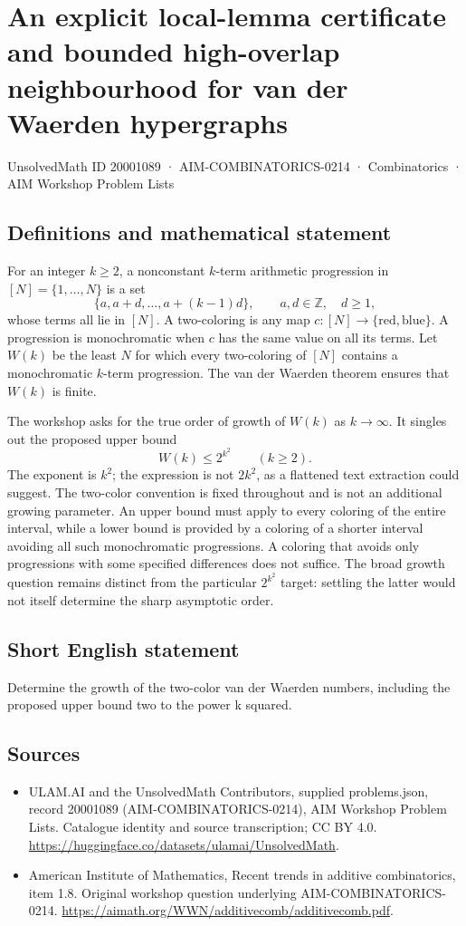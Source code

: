 \documentclass[11pt,a4paper]{article}
\begin{document}
\section*{An explicit local-lemma certificate and bounded high-overlap neighbourhood for van der Waerden hypergraphs}\label{20001089}
{\small UnsolvedMath ID 20001089 · AIM-COMBINATORICS-0214 · Combinatorics · AIM Workshop Problem Lists}
\subsection{Definitions and mathematical statement}
For an integer $k\ge2$, a nonconstant $k$-term arithmetic progression
in $[N]=\{1,\ldots,N\}$ is a set
\[
                   \{a,a+d,\ldots,a+(k-1)d\},
                 \qquad a,d\in\mathbb Z,\quad d\ge1,
\]
whose terms all lie in $[N]$. A two-coloring is any map
$c:[N]\to\{\mathrm{red},\mathrm{blue}\}$. A progression is
monochromatic when $c$ has the same value on all its terms.
Let $W(k)$ be the least $N$ for which every two-coloring of $[N]$
contains a monochromatic $k$-term progression. The van der Waerden
theorem ensures that $W(k)$ is finite.

The workshop asks for the true order of growth of $W(k)$ as
$k\to\infty$. It singles out the proposed upper bound
\[
                              W(k)\le2^{k^2}
                                      \qquad(k\ge2).
\]
The exponent is $k^2$; the expression is not $2k^2$, as a flattened
text extraction could suggest. The two-color convention is fixed
throughout and is not an additional growing parameter.
An upper bound must apply to every coloring of the entire interval,
while a lower bound is provided by a coloring of a shorter interval
avoiding all such monochromatic progressions. A coloring that avoids
only progressions with some specified differences does not suffice.
The broad growth question remains distinct from the particular
$2^{k^2}$ target: settling the latter would not itself determine
the sharp asymptotic order.
\subsection{Short English statement}
Determine the growth of the two-color van der Waerden numbers, including the proposed upper bound two to the power k squared.
\subsection{Sources}
\begin{itemize}
\item[S1] ULAM.AI and the UnsolvedMath Contributors, supplied problems.json, record 20001089 (AIM-COMBINATORICS-0214), AIM Workshop Problem Lists. Catalogue identity and source transcription; CC BY 4.0.
\url{https://huggingface.co/datasets/ulamai/UnsolvedMath}.
\item[S2] American Institute of Mathematics, Recent trends in additive combinatorics, item 1.8. Original workshop question underlying AIM-COMBINATORICS-0214.
\url{https://aimath.org/WWN/additivecomb/additivecomb.pdf}.
\end{itemize}
\end{document}
